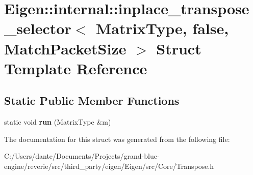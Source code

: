 \hypertarget{struct_eigen_1_1internal_1_1inplace__transpose__selector_3_01_matrix_type_00_01false_00_01_match_packet_size_01_4}{}\section{Eigen\+::internal\+::inplace\+\_\+transpose\+\_\+selector$<$ Matrix\+Type, false, Match\+Packet\+Size $>$ Struct Template Reference}
\label{struct_eigen_1_1internal_1_1inplace__transpose__selector_3_01_matrix_type_00_01false_00_01_match_packet_size_01_4}
\subsection*{Static Public Member Functions}
\begin{DoxyCompactItemize}
\item 
\mbox{\label{struct_eigen_1_1internal_1_1inplace__transpose__selector_3_01_matrix_type_00_01false_00_01_match_packet_size_01_4_af766cb185ec88d2809afc4ed7dd2f3a9}} 
static void {\bfseries run} (Matrix\+Type \&m)
\end{DoxyCompactItemize}


The documentation for this struct was generated from the following file\+:\begin{DoxyCompactItemize}
\item 
C\+:/\+Users/dante/\+Documents/\+Projects/grand-\/blue-\/engine/reverie/src/third\+\_\+party/eigen/\+Eigen/src/\+Core/Transpose.\+h\end{DoxyCompactItemize}
